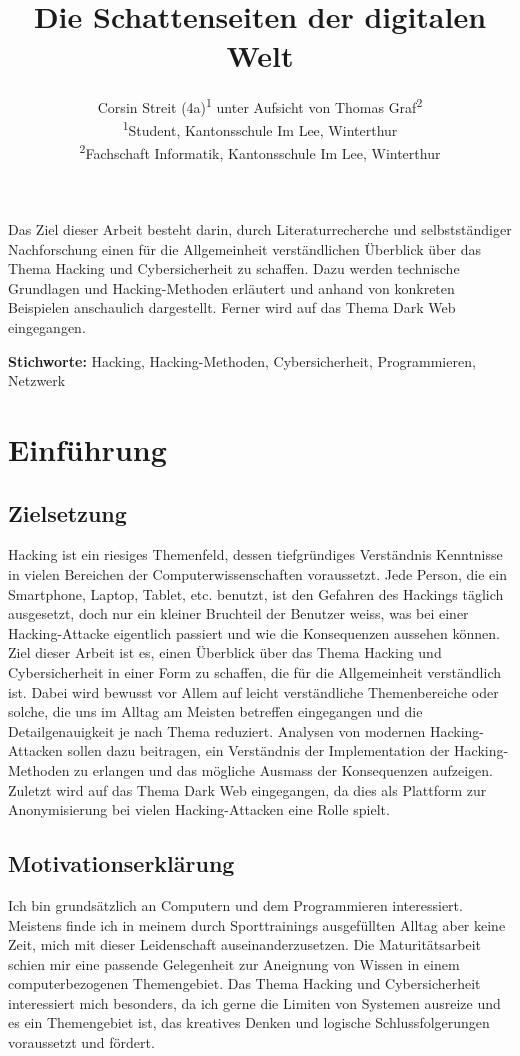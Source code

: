 \documentclass[11pt, a4paper]{article}
\title{\articletype{Hacking und Cybersicherheit} Die Schattenseiten der digitalen Welt}
\author{Corsin Streit (4a)\textsuperscript{1} unter Aufsicht von Thomas Graf\textsuperscript{2} \\
{\footnotesize \textsuperscript{1}Student, Kantonsschule Im Lee, Winterthur} \\
{\footnotesize \textsuperscript{2}Fachschaft Informatik, Kantonsschule Im Lee, Winterthur} \\
}
\date{
	\vspace{12pt}
	\begin{flushleft}
		\normalsize Winterthur, 6. Januar 2025
	\end{flushleft}
}
\renewenvironment{abstract}
  {\begin{mdframed}[
    backgroundcolor=gray!20, 
    innertopmargin=10pt, 
    innerbottommargin=15pt, 
    innerleftmargin=15pt, 
    innerrightmargin=15pt, 
    linewidth=0pt, 
    roundcorner=0pt,
    frametitleaboveskip=5mm, 
    frametitlebelowskip=-1mm, 
    frametitle={\bfseries Abstrakt}, 
    frametitlefont={\bfseries},
    frametitlealignment=\raggedright
    ]
   \vspace{2mm}}
  {\end{mdframed}}
\newcommand{\keywords}[1]{
  \vspace{12pt} 
  \par\noindent\textbf{Stichworte:} #1
}
\begin{document}
\maketitle
\thispagestyle{firstpage}


\begin{abstract}
Das Ziel dieser Arbeit besteht darin, durch Literaturrecherche und selbstständiger Nachforschung einen für die Allgemeinheit verständlichen Überblick über das Thema Hacking und Cybersicherheit zu schaffen. Dazu werden technische Grundlagen und Hacking-Methoden erläutert und anhand von konkreten Beispielen anschaulich dargestellt. Ferner wird auf das Thema Dark Web eingegangen.
\end{abstract}

\keywords{Hacking, Hacking-Methoden, Cybersicherheit, Programmieren, Netzwerk}

\newpage
\hypersetup{linkcolor=black}
\tableofcontents
\hypersetup{linkcolor=RoyalBlue}
\newpage

\section{Einführung}
\subsection{Zielsetzung}
Hacking ist ein riesiges Themenfeld, dessen tiefgründiges Verständnis Kenntnisse in vielen Bereichen der Computerwissenschaften voraussetzt. Jede Person, die ein Smartphone, Laptop, Tablet, etc. benutzt, ist den Gefahren des Hackings täglich ausgesetzt, doch nur ein kleiner Bruchteil der Benutzer weiss, was bei einer Hacking-Attacke eigentlich passiert und wie die Konsequenzen aussehen können. Ziel dieser Arbeit ist es, einen Überblick über das Thema Hacking und Cybersicherheit in einer Form zu schaffen, die für die Allgemeinheit verständlich ist. Dabei wird bewusst vor Allem auf leicht verständliche Themenbereiche oder solche, die uns im Alltag am Meisten betreffen eingegangen und die Detailgenauigkeit je nach Thema reduziert. Analysen von modernen Hacking-Attacken sollen dazu beitragen, ein Verständnis der Implementation der Hacking-Methoden zu erlangen und das mögliche Ausmass der Konsequenzen aufzeigen. Zuletzt wird auf das Thema Dark Web eingegangen, da dies als Plattform zur Anonymisierung bei vielen Hacking-Attacken eine Rolle spielt. 

\subsection{Motivationserklärung}
Ich bin grundsätzlich an Computern und dem Programmieren interessiert. Meistens finde ich in meinem durch Sporttrainings ausgefüllten Alltag aber keine Zeit, mich mit dieser Leidenschaft auseinanderzusetzen. Die Maturitätsarbeit schien mir eine passende Gelegenheit zur Aneignung von Wissen in einem computerbezogenen Themengebiet. Das Thema Hacking und Cybersicherheit interessiert mich besonders, da ich gerne die Limiten von Systemen ausreize und es ein Themengebiet ist, das kreatives Denken und logische Schlussfolgerungen voraussetzt und fördert.
\end{document}
